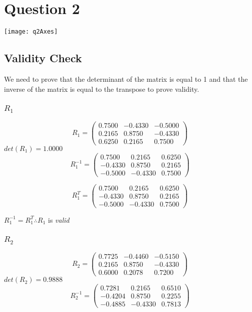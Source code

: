 \newpage
\section{Question 2}
	
	\texttt{[image: q2Axes]}
	\subsection{Validity Check}
	We need to prove that the determinant of the matrix is equal to 1 and that the inverse of the matrix is equal to the transpose to prove validity.
		\subsubsection{$R_{1}$}
			$$
			R_{1} =
			\begin{pmatrix}
				0.7500 & -0.4330 & -0.5000\\
				0.2165 & 0.8750 & -0.4330\\
				0.6250  & 0.2165  & 0.7500
			\end{pmatrix}
			$$
			\hspace{35mm}$det(R_{1}) = 1.0000$
			\\
			$$
			R_{1}^{-1} =
			\begin{pmatrix}
				0.7500 & 0.2165 & 0.6250\\
				-0.4330 & 0.8750 & 0.2165\\
				-0.5000  & -0.4330  & 0.7500
			\end{pmatrix}
			$$
			
			$$
			R_{1}^{T} =
			\begin{pmatrix}
				0.7500 & 0.2165 & 0.6250\\
				-0.4330 & 0.8750 & 0.2165\\
				-0.5000  & -0.4330  & 0.7500
			\end{pmatrix}
			$$
			
			\hspace{30mm}$R_{1}^{-1} = R_{1}^{T}\therefore R_{1}$ is \emph{valid}
			
			
		\subsubsection{$R_{2}$}
			$$
			R_{2} =
			\begin{pmatrix}
				0.7725 & -0.4460 & -0.5150\\
				0.2165 & 0.8750 & -0.4330\\
				0.6000  & 0.2078  & 0.7200
			\end{pmatrix}
			$$
			\hspace{35mm}$det(R_{2}) = 0.9888$
			\\
			$$
			R_{2}^{-1} =
			\begin{pmatrix}
				0.7281 & 0.2165 & 0.6510\\
				-0.4204 & 0.8750 & 0.2255\\
				-0.4885  & -0.4330  & 0.7813
			\end{pmatrix}
			$$
					
